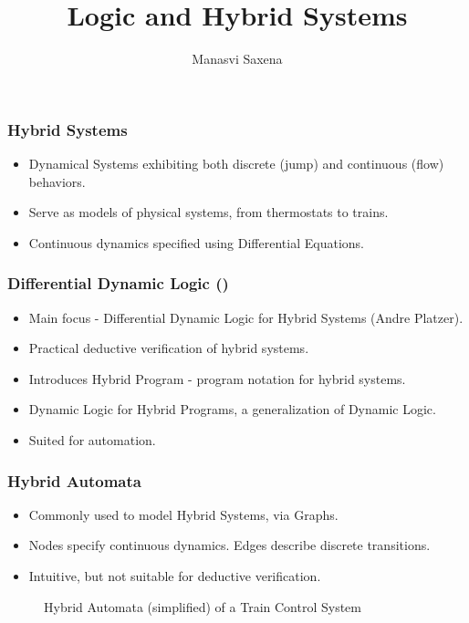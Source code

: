 \documentclass{beamer}
\title{Logic and Hybrid Systems}
\author{Manasvi Saxena}
\institute{Formal Systems Lab, UIUC}
\date{}
\newcommand{\dL}{\text{\upshape\textsf{d{\kern-0.05em}L}}}
\begin{document}
\frame{\titlepage}

\begin{frame}
\frametitle{Hybrid Systems}

\begin{itemize}
  \item Dynamical Systems exhibiting both discrete (jump) and continuous (flow) behaviors.
  \item Serve as models of physical systems, from thermostats to trains.
  \item Continuous dynamics specified using Differential Equations.
\end{itemize}

\end{frame}

\begin{frame}
  \frametitle{Differential Dynamic Logic (\dL)}
  \begin{itemize}
    \item Main focus - Differential Dynamic Logic for Hybrid Systems (Andre
      Platzer).
      \pause
    \item Practical deductive verification of hybrid systems.
      \pause
    \item Introduces Hybrid Program - program notation for hybrid systems.
      \pause
    \item Dynamic Logic for Hybrid Programs, a generalization of Dynamic Logic.
      \pause
    \item Suited for automation.
  \end{itemize}

\end{frame}

\begin{frame}
\frametitle{Hybrid Automata}
\begin{itemize}
  \item Commonly used to model Hybrid Systems, via Graphs.
  \item Nodes specify continuous dynamics. Edges describe discrete transitions.
  \item Intuitive, but not suitable for deductive verification.
\end{itemize}
    \pause
\begin{figure}\label{fig:train-HA}
  \centering
  
  \caption{Hybrid Automata (simplified) of a Train Control System}
\end{figure}
\end{frame}
\end{document}

